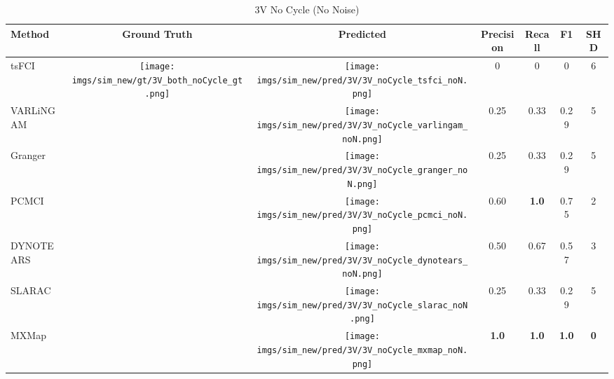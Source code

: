 \begin{table}[htb]
\begin{tabular}{l|c|c|c|c|c|c}
Method    & Ground Truth      & Predicted & Precision    & Recall       & F1           & SHD        \\ \hline
tsFCI     & \multirow{7}{*}[-6.2em]{\begin{minipage}{.17\linewidth} \centering \texttt{[image: imgs/sim\_new/gt/3V\_both\_noCycle\_gt.png]} \end{minipage}} &\begin{minipage}{.17\linewidth} \centering \texttt{[image: imgs/sim\_new/pred/3V/3V\_noCycle\_tsfci\_noN.png]} \end{minipage}           & 0            & 0            & 0            & 6          \\
VARLiNGAM &                   &  \begin{minipage}{.17\linewidth} \centering \texttt{[image: imgs/sim\_new/pred/3V/3V\_noCycle\_varlingam\_noN.png]} \end{minipage} & 0.25         & 0.33         & 0.29         & 5          \\
Granger   &                   &\begin{minipage}{.17\linewidth} \centering \texttt{[image: imgs/sim\_new/pred/3V/3V\_noCycle\_granger\_noN.png]} \end{minipage}  & 0.25         & 0.33         & 0.29         & 5          \\
PCMCI     &                   & \begin{minipage}{.17\linewidth} \centering \texttt{[image: imgs/sim\_new/pred/3V/3V\_noCycle\_pcmci\_noN.png]} \end{minipage} & 0.60         & \textbf{1.0} & 0.75         & 2          \\
DYNOTEARS &                   & \begin{minipage}{.17\linewidth} \centering \texttt{[image: imgs/sim\_new/pred/3V/3V\_noCycle\_dynotears\_noN.png]} \end{minipage} & 0.50         & 0.67         & 0.57         & 3          \\
SLARAC    &                   &  \begin{minipage}{.17\linewidth} \centering \texttt{[image: imgs/sim\_new/pred/3V/3V\_noCycle\_slarac\_noN.png]} \end{minipage} & 0.25         & 0.33         & 0.29         & 5          \\ \cline{1-1} \cline{3-7} 
MXMap     &                   & \begin{minipage}{.17\linewidth} \centering \texttt{[image: imgs/sim\_new/pred/3V/3V\_noCycle\_mxmap\_noN.png]} \end{minipage} & \textbf{1.0} & \textbf{1.0} & \textbf{1.0} & \textbf{0}
\end{tabular}
\caption{3V No Cycle (No Noise)}
\label{tab:3V_noCycle_noN}
\end{table}


